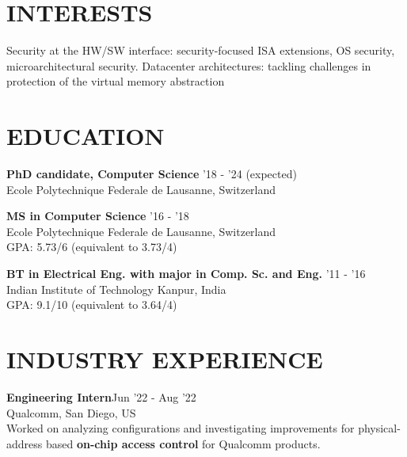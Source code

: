 \documentclass[margin, 10pt]{res} %
\begin{document}
\begin{resume}

 
\section{INTERESTS }  
 
Security at the HW/SW interface: security-focused ISA extensions, OS security, microarchitectural security. 
Datacenter architectures: tackling challenges in protection of the virtual memory abstraction

\section{EDUCATION}

{\bf PhD candidate, Computer Science}  \hfill '18 - '24 (expected) \\
Ecole Polytechnique Federale de Lausanne, Switzerland 

{\bf MS in Computer Science}  \hfill '16 - '18 \\
Ecole Polytechnique Federale de Lausanne, Switzerland \\
GPA: 5.73/6 (equivalent to 3.73/4) 

{\bf BT in Electrical Eng. with major in Comp. Sc. and Eng.} \hfill  '11 - '16 \\
Indian Institute of Technology Kanpur, India \\
GPA: 9.1/10 (equivalent to 3.64/4)
 
 
\section{INDUSTRY EXPERIENCE}
{\bf Engineering Intern}\hfill Jun '22 - Aug '22 \\
Qualcomm, San Diego, US \\
Worked on analyzing configurations and investigating improvements for physical-address based {\bf on-chip access control} for Qualcomm products.


\end{resume}
\end{document}
